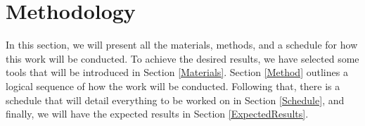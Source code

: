 \section{Methodology}

In this section, we will present all the materials, methods, and a schedule for how this work will be conducted. To achieve the desired results, we have selected some tools that will be introduced in Section \ref{Materials}. Section \ref{Method} outlines a logical sequence of how the work will be conducted. Following that, there is a schedule that will detail everything to be worked on in Section \ref{Schedule}, and finally, we will have the expected results in Section \ref{ExpectedResults}.
